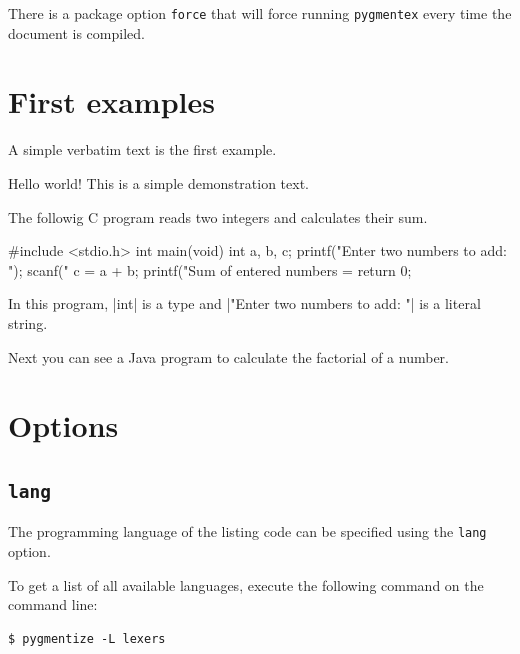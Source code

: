 \documentclass[10pt,a4paper]{article}
\begin{document}
There is a package option \texttt{force} that will force running
\texttt{pygmentex} every time the document is compiled.

\section{First examples}

A simple verbatim text is the first example.

\begin{Example}
\begin{pygmented}[]
Hello world!
  This is a simple demonstration text.
\end{pygmented}
\end{Example}

The followig C program reads two integers and calculates their sum.

\begin{Example}
\begin{pygmented}[lang=c]
#include <stdio.h>
int main(void)
{
   int a, b, c;
   printf("Enter two numbers to add: ");
   scanf("%
   c = a + b;
   printf("Sum of entered numbers = %
   return 0;
}
\end{pygmented}
\end{Example}

\begin{Example}
  In this program, \pyginline[lang=c]|int| is a type and
  \pyginline[lang=c]|"Enter two numbers to add: "| is a literal string.
\end{Example}

Next you can see a Java program to calculate the factorial of a number.

\begin{Example}
\end{Example}

\section{Options}
\subsection{\texttt{lang}}
The programming language of the listing code can be specified using the
\verb|lang| option.

To get a list of all available languages, execute the following command
on the command line:
\begin{verbatim}
$ pygmentize -L lexers
\end{verbatim}
\end{document}
